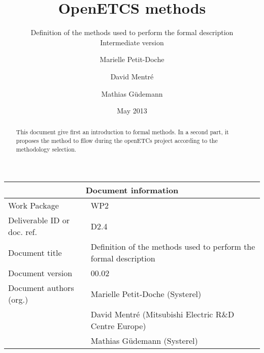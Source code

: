 \documentclass{template/openetcs_article}
\begin{document}
\frontmatter
{}




\title{OpenETCS methods}

\subtitle{ Definition of the methods used to perform the formal description \\
Intermediate version}

\date{May 2013}


\author{Marielle Petit-Doche}


\author{David Mentré}

\author{Mathias Güdemann}





\begin{abstract}
This document give first an introduction to formal  methods.
In a second part, it proposes the method to  fllow during the openETCs project according to the methodology selection.

\end{abstract}

\maketitle
\tableofcontents
\listoffiguresandtables
\newpage

\begin{tabular}{|p{4.4cm}|p{8.7cm}|}
\hline
\multicolumn{2}{|c|}{Document information} \\
\hline
Work Package &  WP2  \\
Deliverable ID or doc. ref. & D2.4\\
\hline
Document title & Definition of the methods used to perform the formal description \\
Document version & 00.02 \\
Document authors (org.)  & Marielle Petit-Doche (Systerel)  \\
  & David Mentré (Mitsubishi Electric R\&D Centre Europe)  \\
  & Mathias Güdemann (Systerel)  \\
\hline
\end{tabular}
\end{document}
